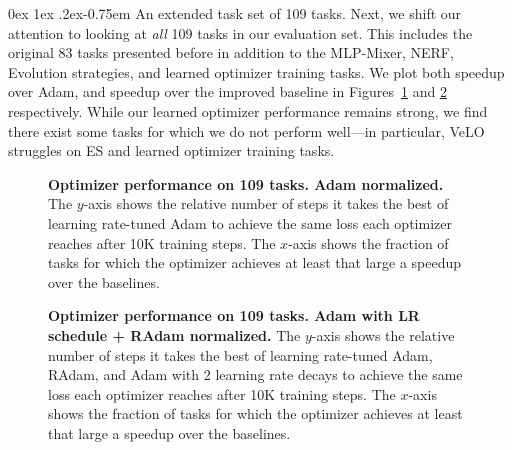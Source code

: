 \documentclass[11pt]{article}
\makeatletter
\renewcommand{\paragraph}{%
  \@startsection{paragraph}{4}%
  {\z@}{0ex \@plus 1ex \@minus .2ex}{-0.75em}%
  {\normalfont\normalsize\bfseries}%
}
\makeatother
\begin{document}
\paragraph{An extended task set of 109 tasks.}
Next, we shift our attention to looking at \emph{all} 109 tasks in our evaluation set.
This includes the original 83 tasks presented before in addition to the MLP-Mixer, NERF, Evolution strategies, and learned optimizer training tasks. We plot both speedup over Adam, and speedup over the improved baseline in Figures~\ref{fig:aggregate_100_adam} and \ref{fig:aggregate_100_baseline} respectively. While our learned optimizer performance remains strong, we find there exist some tasks for which we do not perform well---in particular, VeLO struggles on ES and learned optimizer training tasks.


\begin{figure}[t!]
    \centering
    \caption{\textbf{Optimizer performance on 109 tasks. Adam normalized.} The $y$-axis shows the relative number of steps it takes the best of learning rate-tuned Adam to achieve the same loss each optimizer reaches after 10K training steps.
    The $x$-axis shows the fraction of tasks for which the optimizer achieves at least that large a speedup over the baselines.
    \label{fig:aggregate_100_adam}
    }
\end{figure}

\begin{figure}[t!]
    \centering
    \caption{\textbf{Optimizer performance on 109 tasks. Adam with LR schedule + RAdam normalized.} The $y$-axis shows the relative number of steps it takes the best of learning rate-tuned Adam, RAdam, and Adam with 2 learning rate decays to achieve the same loss each optimizer reaches after 10K training steps.
    The $x$-axis shows the fraction of tasks for which the optimizer achieves at least that large a speedup over the baselines.
    \label{fig:aggregate_100_baseline}
    }
\end{figure}
\end{document}
